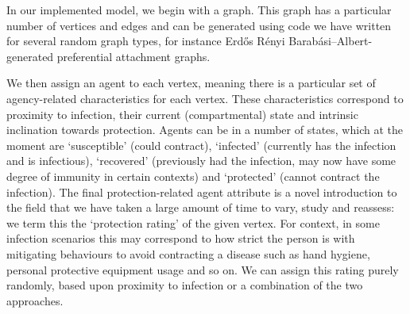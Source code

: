 \documentclass[../report.tex]{subfiles}
\begin{document}
In our implemented model, we begin with a graph. This graph has a particular number of vertices and edges and can be generated using code we have written for several random graph types, for instance Erd\H{o}s R\'enyi Barab\'asi–Albert-generated preferential attachment graphs.

We then assign an agent to each vertex, meaning there is a particular set of agency-related characteristics for each vertex. These characteristics correspond to proximity to infection, their current (compartmental) state and intrinsic inclination towards protection. Agents can be in a number of states, which at the moment are `susceptible' (could contract), `infected' (currently has the infection and is infectious), `recovered' (previously had the infection, may now have some degree of immunity in certain contexts) and `protected' (cannot contract the infection). The final protection-related agent attribute is a novel introduction to the field that we have taken a large amount of time to vary, study and reassess: we term this the `protection rating' of the given vertex. For context, in some infection scenarios this may correspond to how strict the person is with mitigating behaviours to avoid contracting a disease such as hand hygiene, personal protective equipment usage and so on. We can assign this rating purely randomly, based upon proximity to infection or a combination of the two approaches.
\end{document}

